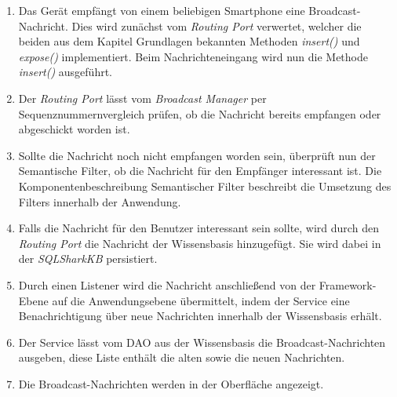 \begin{enumerate}
	\item Das Gerät empfängt von einem beliebigen Smartphone eine Broadcast-Nachricht. Dies wird zunächst vom \textit{Routing Port} verwertet, welcher die beiden aus dem Kapitel Grundlagen bekannten Methoden \textit{insert()} und \textit{expose()} implementiert. Beim Nachrichteneingang wird nun die Methode \textit{insert()} ausgeführt.
	\item Der \textit{Routing Port} lässt vom \textit{Broadcast Manager} per Sequenznummernvergleich prüfen, ob die Nachricht bereits empfangen oder abgeschickt worden ist.
	\item Sollte die Nachricht noch nicht empfangen worden sein, überprüft nun der Semantische Filter, ob die Nachricht für den Empfänger interessant ist. Die Komponentenbeschreibung Semantischer Filter beschreibt die Umsetzung des Filters innerhalb der Anwendung. 
	\item Falls die Nachricht für den Benutzer interessant sein sollte, wird durch den \textit{Routing Port} die Nachricht der Wissensbasis hinzugefügt. Sie wird dabei in der \textit{SQLSharkKB} persistiert.
	\item Durch einen Listener wird die Nachricht anschließend von der Framework-Ebene auf die Anwendungsebene übermittelt, indem der Service eine Benachrichtigung über neue Nachrichten innerhalb der Wissensbasis erhält. 
	\item Der Service lässt vom DAO aus der Wissensbasis die Broadcast-Nachrichten ausgeben, diese Liste enthält die alten sowie die neuen Nachrichten.
	\item Die Broadcast-Nachrichten werden in der Oberfläche angezeigt.
\end{enumerate}

